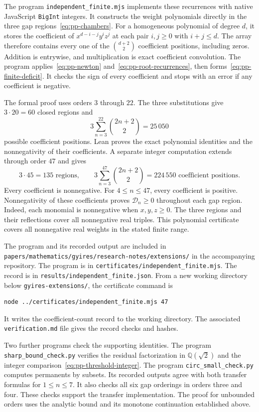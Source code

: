 \documentclass[11pt,a4paper]{article}
\theoremstyle{definition}
\theoremstyle{remark}
\begin{document}
The program \nolinkurl{independent_finite.mjs} implements these recurrences with native JavaScript \texttt{BigInt} integers.
It constructs the weight polynomials directly in the three gap regions~\eqref{eq:pp-chambers}.
For a homogeneous polynomial of degree $d$, it stores the coefficient of
$x^{d-i-j}y^iz^j$ at each pair $i,j\ge0$ with $i+j\le d$.
The array therefore contains every one of the $\binom{d+2}{2}$ coefficient positions, including zeros.
Addition is entrywise, and multiplication is exact coefficient convolution.
The program applies~\eqref{eq:pp-newton} and~\eqref{eq:pp-root-recurrences}, then forms~\eqref{eq:pp-finite-deficit}.
It checks the sign of every coefficient and stops with an error if any coefficient is negative.

The formal proof uses orders $3$ through $22$.
The three substitutions give $3\cdot20=60$ closed regions and
\[
3\sum_{n=3}^{22}\binom{2n+2}{2}=25\,050
\]
possible coefficient positions.
Lean proves the exact polynomial identities and the nonnegativity of their coefficients.
A separate integer computation extends through order $47$ and gives
\[
3\cdot45=135\text{ regions},\qquad
3\sum_{n=3}^{47}\binom{2n+2}{2}=224\,550\text{ coefficient positions}.
\]
Every coefficient is nonnegative.
For $4\le n\le47$, every coefficient is positive.
Nonnegativity of these coefficients proves $\mathcal D_n\ge0$ throughout each gap region.
Indeed, each monomial is nonnegative when $x,y,z\ge0$.
The three regions and their reflections cover all nonnegative real triples.
This polynomial certificate covers all nonnegative real weights in the stated finite range.

The program and its recorded output are included in
\nolinkurl{papers/mathematics/gyires/research-notes/extensions/} in the accompanying repository.
The program is in \nolinkurl{certificates/independent_finite.mjs}.
The record is in \nolinkurl{results/independent_finite.json}.
From a new working directory below \nolinkurl{gyires-extensions/}, the certificate command is
\begin{verbatim}
node ../certificates/independent_finite.mjs 47
\end{verbatim}
It writes the coefficient-count record to the working directory.
The associated \nolinkurl{verification.md} file gives the record checks and hashes.

Two further programs check the supporting identities.
The program \nolinkurl{sharp_bound_check.py} verifies the residual factorization in $\mathbb Q(\sqrt2)$ and the integer comparison~\eqref{eq:pp-threshold-integer}.
The program \nolinkurl{circ_small_check.py} computes permanents by subsets.
Its recorded outputs agree with both transfer formulas for $1\le n\le7$.
It also checks all six gap orderings in orders three and four.
These checks support the transfer implementation.
The proof for unbounded orders uses the analytic bound and its monotone continuation established above.
\end{document}
